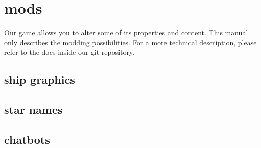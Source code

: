 \chapter*{mods}
Our game allows you to alter some of its properties and content. This manual only describes the modding possibilities. For a more technical description, please refer to the docs inside our git repository. 

\section*{ship graphics}


\section*{star names}

\section*{chatbots}
